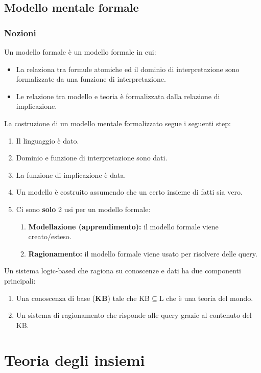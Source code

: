 \documentclass[../main.tex]{subfiles}
\begin{document}
    \section{Modello mentale formale}
    \subsection{Nozioni}
    Un modello formale è un modello formale in cui:
    \begin{itemize}
        \item La relaziona tra formule atomiche ed il dominio di interpretazione sono formalizzate da una funzione di interpretazione.
        \item Le relazione tra modello e teoria è formalizzata dalla relazione di implicazione.
    \end{itemize}
    La costruzione di un modello mentale formalizzato segue i seguenti step:
    \begin{enumerate}
        \item Il linguaggio è dato.
        \item Dominio e funzione di interpretazione sono dati.
        \item La funzione di implicazione è data.
        \item Un modello è costruito assumendo che un certo insieme di fatti sia vero.
        \item Ci sono \textbf{solo} 2 usi per un modello formale:
        \begin{enumerate}
            \item \textbf{Modellazione (apprendimento):} il modello formale viene creato/esteso.
            \item \textbf{Ragionamento:} il modello formale viene usato per risolvere delle query.
        \end{enumerate}
    \end{enumerate}
    Un sistema logic-based che ragiona su conoscenze e dati ha due componenti principali:
    \begin{enumerate}
        \item Una conoscenza di base (\textbf{KB}) tale che KB$\subseteq$L che è una teoria del mondo.
        \item Un sistema di ragionamento che risponde alle query grazie al contenuto del KB.
    \end{enumerate}

    \chapter{Teoria degli insiemi}
\end{document}
